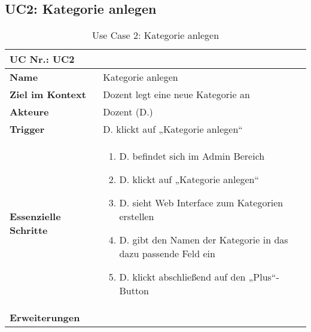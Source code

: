 \begin{table}
\subsection{UC2: Kategorie anlegen}\label{uc:UC2}
	\begin{tabular}{|p{3cm}|p{11.06cm}|}
	\hline
		\multicolumn{2}{|l|}{\textbf{UC Nr.: UC2} }   \\ \hline
		\textbf{Name}                 &     Kategorie anlegen   \\ \hline
		\textbf{Ziel im Kontext}      &     Dozent legt eine neue Kategorie an   \\ \hline
		\textbf{Akteure}              &     Dozent (D.)    \\ \hline
		\textbf{Trigger}              &     D. klickt auf „Kategorie anlegen“    \\ \hline
		\textbf{Essenzielle Schritte} & 
			\begin{enumerate} 
			  \item D. befindet sich im Admin Bereich
			  \item D. klickt auf „Kategorie anlegen“
			  \item D. sieht Web Interface zum Kategorien erstellen
			  \item D. gibt den Namen der Kategorie in das dazu passende Feld ein
			  \item	D. klickt abschließend auf den „Plus“-Button
			\end{enumerate}
		\\ \hline
		\textbf{Erweiterungen} 		  &         \\ \hline
	\end{tabular}
	\caption{Use Case 2: Kategorie anlegen}
\end{table}\FloatBarrier



